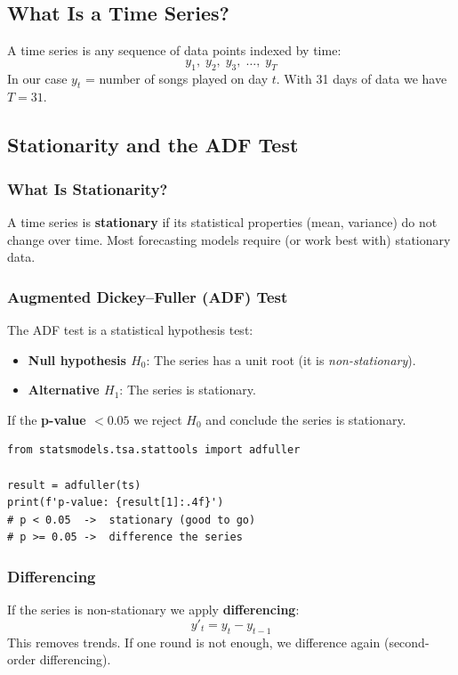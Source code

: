 \documentclass[12pt, a4paper]{article}
\begin{document}
\subsection{What Is a Time Series?}
A time series is any sequence of data points indexed by time:
\[
    y_1, \; y_2, \; y_3, \; \ldots, \; y_T
\]
In our case $y_t$ = number of songs played on day $t$. With 31 days of data
we have $T = 31$.

\subsection{Stationarity and the ADF Test}

\subsubsection{What Is Stationarity?}
A time series is \textbf{stationary} if its statistical properties (mean,
variance) do not change over time. Most forecasting models require (or work
best with) stationary data.

\subsubsection{Augmented Dickey--Fuller (ADF) Test}
The ADF test is a statistical hypothesis test:
\begin{itemize}
    \item \textbf{Null hypothesis $H_0$}: The series has a unit root (it is
          \emph{non-stationary}).
    \item \textbf{Alternative $H_1$}: The series is stationary.
\end{itemize}
If the \textbf{p-value $< 0.05$} we reject $H_0$ and conclude the series is
stationary.

\begin{lstlisting}
from statsmodels.tsa.stattools import adfuller

result = adfuller(ts)
print(f'p-value: {result[1]:.4f}')
# p < 0.05  ->  stationary (good to go)
# p >= 0.05 ->  difference the series
\end{lstlisting}

\subsubsection{Differencing}
If the series is non-stationary we apply \textbf{differencing}:
\[
    y'_t = y_t - y_{t-1}
\]
This removes trends. If one round is not enough, we difference again
(second-order differencing).
\end{document}
